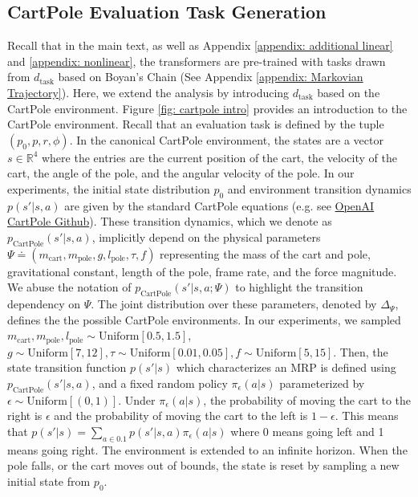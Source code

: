 \documentclass{article}
\newcommand{\R}{\mathbb{R}}
\newcommand{\uniform}[1]{{\text{Uniform}\left[#1\right]}}
\begin{document}
\subsection{CartPole Evaluation Task Generation}
 Recall that in the main text, as well as Appendix \ref{appendix: additional linear} and \ref{appendix: nonlinear}, the transformers are pre-trained with tasks drawn from $d_{\text{task}}$ based on Boyan's Chain (See Appendix \ref{appendix: Markovian Trajectory}). Here, we extend the analysis by introducing $d_{\text{task}}$ based on the CartPole environment. Figure \ref{fig: cartpole intro} provides an introduction to the CartPole environment.
Recall that an evaluation task is defined by the tuple $(p_0, p, r, \phi)$.
In the canonical CartPole environment, the states are a vector $s \in \R^4$ where the entries are the current position of the cart, the velocity of the cart, the angle of the pole, and the angular velocity of the pole.
In our experiments, the initial state distribution $p_0$ and environment transition dynamics $p(s'|s,a)$ are given by the standard CartPole equations (e.g. see \href{https://github.com/openai/gym/blob/master/gym/envs/classic\_control/cartpole.py}{OpenAI CartPole Github}).
These transition dynamics, which we denote as $p_{\text{CartPole}}(s'|s,a)$, implicitly depend on the physical parameters $\Psi \doteq (m_{\text{cart}}, m_{\text{pole}}, g, l_{\text{pole}}, \tau, f)$ representing the mass of the cart and pole, gravitational constant, length of the pole, frame rate, and the force magnitude. We abuse the notation of $p_{\text{CartPole}}(s'|s,a;\Psi)$ to highlight the transition dependency on $\Psi$. The joint distribution over these parameters, denoted by $\Delta_\Psi$, defines the the possible CartPole environments. In our experiments, we sampled $m_{\text{cart}}, m_{\text{pole}}, l_{\text{pole}}  \sim \uniform{0.5,1.5}$, $g\sim \uniform{7,12}, \tau \sim \uniform{0.01,0.05}, f \sim \uniform{5,15}$.
Then, the state transition function $p(s'|s)$ which characterizes an MRP is defined using $p_{\text{CartPole}}(s'|s,a)$, and a fixed random policy $\pi_{\epsilon}(a|s)$ parameterized by $\epsilon \sim \uniform{(0,1)}$.
Under $\pi_{\epsilon}(a|s)$, the probability of moving the cart to the right is $\epsilon$ and the probability of moving the cart to the left is $1-\epsilon$.
This means that $p(s'|s) = \sum_{a\in \qty{0,1}} p(s'|s,a)\pi_\epsilon(a|s)$ where 0 means going left and 1 means going right. The environment is extended to an infinite horizon. When the pole falls, or the cart moves out of bounds, the state is reset by sampling a new initial state from $p_0$.
\end{document}
